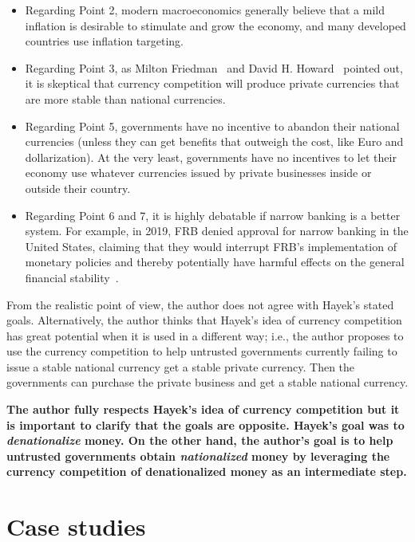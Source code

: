 \documentclass[dvipdfmx,a4paper]{article}
\begin{document}
\begin{itemize}
\item Regarding Point 2, modern macroeconomics generally believe that a mild inflation is desirable to stimulate and grow the economy, and many developed countries use inflation targeting.
\item Regarding Point 3, as Milton Friedman~\cite{friedman1986has} and David H. Howard~\cite{howard1977denationalization} pointed out, it is skeptical that currency competition will produce private currencies that are more stable than national currencies.
\item Regarding Point 5, governments have no incentive to abandon their national currencies (unless they can get benefits that outweigh the cost, like Euro and dollarization). At the very least, governments have no incentives to let their economy use whatever currencies issued by private businesses inside or outside their country.
\item Regarding Point 6 and 7, it is highly debatable if narrow banking is a better system. For example, in 2019, FRB denied approval for narrow banking in the United States, claiming that they would interrupt FRB's implementation of monetary policies and thereby potentially have harmful effects on the general financial stability~\cite{grasselli2019broad}.
\end{itemize}

From the realistic point of view, the author does not agree with Hayek's stated goals. Alternatively, the author thinks that Hayek's idea of currency competition has great potential when it is used in a different way; i.e., the author proposes to use the currency competition to help untrusted governments currently failing to issue a stable national currency get a stable private currency. Then the governments can purchase the private business and get a stable national currency.

\textbf{The author fully respects Hayek's idea of currency competition but it is important to clarify that the goals are opposite. Hayek's goal was to \textit{denationalize} money. On the other hand, the author's goal is to help untrusted governments obtain \textit{nationalized} money by leveraging the currency competition of denationalized money as an intermediate step.}

\section{Case studies}
\end{document}
